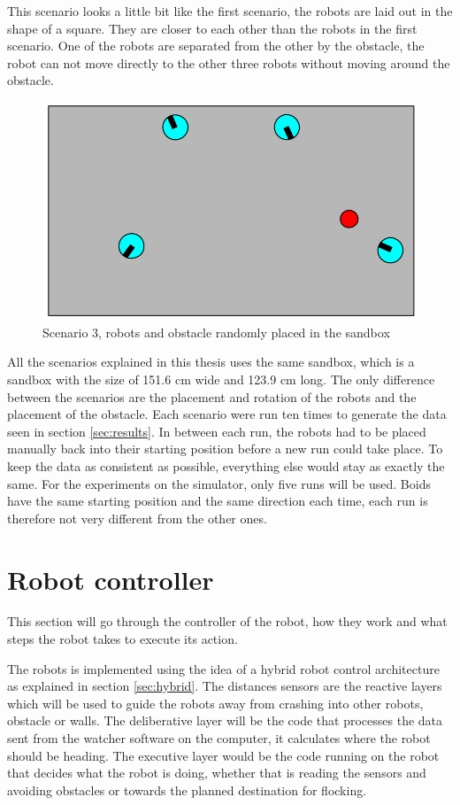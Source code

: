 This scenario looks a little bit like the first scenario, the robots are laid out in the shape of a square. They are closer to each other than the robots in the first scenario. One of the robots are separated from the other by the obstacle, the robot can not move directly to the other three robots without moving around the obstacle.
\begin{figure}[h!]
\begin{center}
\includegraphics[width=0.8\linewidth]{figs/scenario2}
\end{center}
\caption[scenario 3]{Scenario 3, robots and obstacle randomly placed in the sandbox}
\label{fig:scenario3}
\end{figure}

All the scenarios explained in this thesis uses the same sandbox, which is a sandbox with the size of 151.6 cm wide and 123.9 cm long. The only difference between the scenarios are the placement and rotation of the robots and the placement of the obstacle. Each scenario were run ten times to generate the data seen in section \ref{sec:results}.
In between each run, the robots had to be placed manually back into their starting position before a new run could take place. To keep the data as consistent as possible, everything else would stay as exactly the same.
For the experiments on the simulator, only five runs will be used. Boids have the same starting position and the same direction each time, each run is therefore not very different from the other ones. 

\section{Robot controller}
This section will go through the controller of the robot, how they work and what steps the robot takes to execute its action.

The robots is implemented using the idea of a hybrid robot control architecture as explained in section \ref{sec:hybrid}. The distances sensors are the reactive layers which will be used to guide the robots away from crashing into other robots, obstacle or walls. The deliberative layer will be the code that processes the data sent from the watcher software on the computer, it calculates where the robot should be heading. The executive layer would be the code running on the robot that decides what the robot is doing, whether that is reading the sensors and avoiding obstacles or towards the planned destination for flocking.

